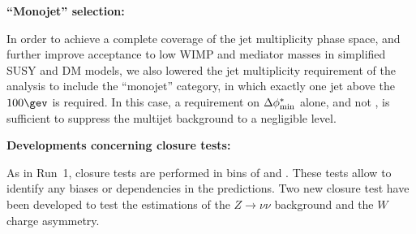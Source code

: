 {\bf ``Monojet'' selection:}

In order to achieve a complete coverage of the jet multiplicity phase space,
and further improve acceptance to low WIMP and mediator masses
in simplified SUSY and DM models, we also lowered the jet multiplicity 
requirement of the analysis to include the ``monojet'' category, in which
exactly one jet above the $100\gev$ is required. In this case, a requirement on
$\mbox{$\Delta\phi^{*}_{\rm min}$}$ alone, and not \alphat, is sufficient to suppress the multijet
background to a negligible level.



{\bf Developments concerning closure tests:}

As in Run~1, closure tests are performed in bins of \njet and
\scalht. These tests allow to identify any biases or dependencies
in the predictions. 
Two new closure test have been developed to test the estimations of the $Z \to \nu \nu$
background and the $W$ charge asymmetry. 

